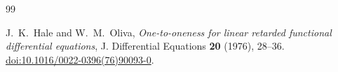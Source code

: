 \documentclass[11pt,a4paper]{article}
\theoremstyle{remark}
\begin{document}
\begin{thebibliography}{99}
\small
\setlength{\itemsep}{3pt}

J.~K.~Hale and W.~M.~Oliva,
\emph{One-to-oneness for linear retarded functional differential equations},
J. Differential Equations \textbf{20} (1976), 28--36.
\href{https://doi.org/10.1016/0022-0396(76)90093-0}{doi:10.1016/0022-0396(76)90093-0}.
\end{thebibliography}
\end{document}
